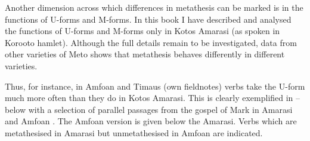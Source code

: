 Another dimension across which differences in metathesis
can be marked is in the functions of U-forms and M-forms.
In this book I have described and analysed the functions of U-forms and M-forms
only in Kotos Amarasi (as spoken in Koro{\Q}oto hamlet).
Although the full details remain to be investigated,
data from other varieties of Meto shows that metathesis
behaves differently in different varieties.

Thus, for instance, in Amfo{\Q}an \citep{cu18}
and Timaus (own fieldnotes) verbs take the U-form
much more often than they do in Kotos Amarasi.
This is clearly exemplified in --
below with a selection of parallel passages from the gospel
of Mark in Amarasi and Amfo{\Q}an \citep{UBB18}.
The Amfo{\Q}an version is given below the Amarasi.
Verbs which are metathesised in Amarasi but
unmetathesised in Amfo{\Q}an are indicated.

\begin{exe}\let\eachwordtwo=\ve
	\label{ex:Mark 1:2}
	\label{ex:Mark 3:24}
	\label{ex:Mark 11:19}
	\label{ex:Mark 16:7}
\end{exe}

